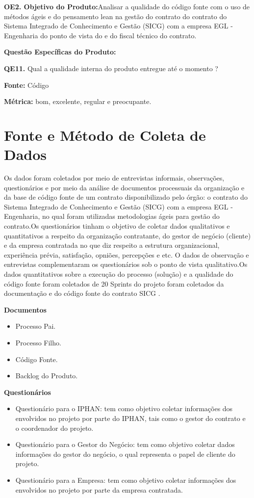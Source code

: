 \textbf{OE2. Objetivo do Produto:}Analisar a qualidade do código fonte com o uso de métodos ágeis e do pensamento lean na gestão do contrato do contrato do Sistema Integrado 
de Conhecimento e Gestão (SICG) com a empresa EGL - Engenharia do ponto de vista do  e do fiscal técnico do contrato.

\textbf{Questão Específicas do Produto:}

\textbf{QE11.} Qual a qualidade interna do produto entregue até o momento ?

\textbf{Fonte:} Código

\textbf{Métrica:} bom, excelente, regular e preocupante.


\section[Fonte e Método Coleta de Dados]{Fonte e Método de Coleta de Dados}

Os dados foram coletados por meio de entrevistas informais, observações, questionários e por meio da análise de documentos processuais da organização e da base de código fonte de um contrato disponibilizado pelo órgão: o contrato do Sistema Integrado de Conhecimento e Gestão (SICG) com a empresa EGL - Engenharia, no qual foram utilizadas metodologias ágeis para gestão do contrato.Os questionários tinham o objetivo de coletar dados qualitativos e
quantitativos a respeito da organização contratante, do gestor de negócio (cliente) e da empresa contratada no que diz respeito a estrutura organizacional, experiência prévia, satisfação, opniões, percepções e etc. O dados de observação e entrevistas
complementaram os questionários sob o ponto de vista qualitativo.Os dados quantitativos
sobre a execução do processo (solução) e a qualidade do código fonte foram coletados de 20 Sprints do projeto foram coletados da documentação e do código fonte do contrato SICG .

\textbf{Documentos}
\begin{itemize}
\item Processo Pai.
\item Processo Filho.
\item Código Fonte.
\item Backlog do Produto.
\end{itemize}

\textbf{Questionários}
\begin{itemize}
\item Questionário para o IPHAN: tem como objetivo coletar informações dos envolvidos no projeto por parte do IPHAN, tais como o gestor do contrato e o coordenador do projeto.
\item Questionário para o Gestor do Negócio: tem como objetivo coletar dados informações do gestor do negócio, o qual representa o papel de cliente do projeto. 
\item Questionário para a Empresa: tem como objetivo coletar informações dos envolvidos no projeto por parte da empresa contratada.
\end{itemize}

